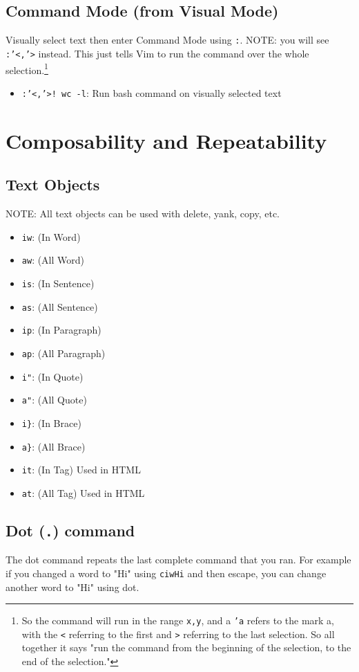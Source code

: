 \documentclass[11pt]{article}
\begin{document}
\subsection{Command Mode (from Visual Mode)}
\label{sec:orga6e8057}
Visually select text then enter Command Mode using \texttt{:}. NOTE: you will see
\texttt{:'<,'>} instead. This just tells Vim to run the command over the whole
selection.\footnote{So the command will run in the range \texttt{x,y}, and 
a \texttt{'a} refers to the mark a, with the \texttt{<} referring to the first and \texttt{>}
referring to the last selection. So all together it says "run the command from
the beginning of the selection, to the end of the selection."}

\begin{itemize}
\item \texttt{:'<,'>! wc -l}: Run bash command on visually selected text
\end{itemize}
\section{Composability and Repeatability}
\label{sec:orgfdeb1c2}
\subsection{Text Objects}
\label{sec:org5d2794e}
NOTE: All text objects can be used with delete, yank, copy, etc.

\begin{itemize}
\item \texttt{iw}: (In Word)
\item \texttt{aw}: (All Word)
\item \texttt{is}: (In Sentence)
\item \texttt{as}: (All Sentence)
\item \texttt{ip}: (In Paragraph)
\item \texttt{ap}: (All Paragraph)
\item \texttt{i"}: (In Quote)
\item \texttt{a"}: (All Quote)
\item \texttt{i\}}: (In Brace)
\item \texttt{a\}}: (All Brace)
\item \texttt{it}: (In Tag) Used in HTML
\item \texttt{at}: (All Tag) Used in HTML
\end{itemize}
\subsection{Dot (\texttt{.}) command}
\label{sec:org4ff568c}
The dot command repeats the last complete command that you ran. For example if
you changed a word to "Hi" using \texttt{ciwHi} and then escape, you can change another
word to "Hi" using dot.
\end{document}
